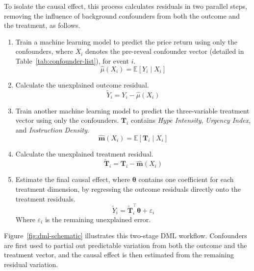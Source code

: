 To isolate the causal effect, this process calculates residuals in two parallel steps, removing the influence of background confounders from both the outcome and the treatment, as follows.
\begin{enumerate}
\item Train a machine learning model to predict the price return using only the confounders, where $X_i$ denotes the pre-reveal confounder vector (detailed in Table~\ref{tab:confounder-list}), for event $i$.
\begin{equation}
\widehat{\mu}(X_i) = \mathbb{E}[Y_i \mid X_i]
\label{eq:outcome_model}
\end{equation}

\item Calculate the unexplained outcome residual.
\begin{equation}
\widetilde{Y}_i = Y_i - \widehat{\mu}(X_i)
\label{eq:outcome_residual}
\end{equation}

\item Train another machine learning model to predict the three-variable treatment vector using only the confounders. $\mathbf{T}_i$ contains \textit{Hype Intensity}, \textit{Urgency Index}, and \textit{Instruction Density}.
\begin{equation}
\widehat{\mathbf{m}}(X_i) = \mathbb{E}[\mathbf{T}_i \mid X_i]
\label{eq:treatment_model}
\end{equation}

\item Calculate the unexplained treatment residual.
\begin{equation}
\widetilde{\mathbf{T}}_i = \mathbf{T}_i - \widehat{\mathbf{m}}(X_i)
\label{eq:treatment_residual}
\end{equation}

\item Estimate the final causal effect, where $\boldsymbol{\theta}$ contains one coefficient for each treatment dimension, by regressing the outcome residuals directly onto the treatment residuals.
\begin{equation}
\widetilde{Y}_i = \widetilde{\mathbf{T}}_i^{\top}\boldsymbol{\theta} + \varepsilon_i
\label{eq:final_causal_effect}
\end{equation}
Where $\varepsilon_i$ is the remaining unexplained error.
\end{enumerate}

Figure~\ref{fig:dml-schematic} illustrates this two-stage DML workflow. Confounders are first used to partial out predictable variation from both the outcome and the treatment vector, and the causal effect is then estimated from the remaining residual variation.

